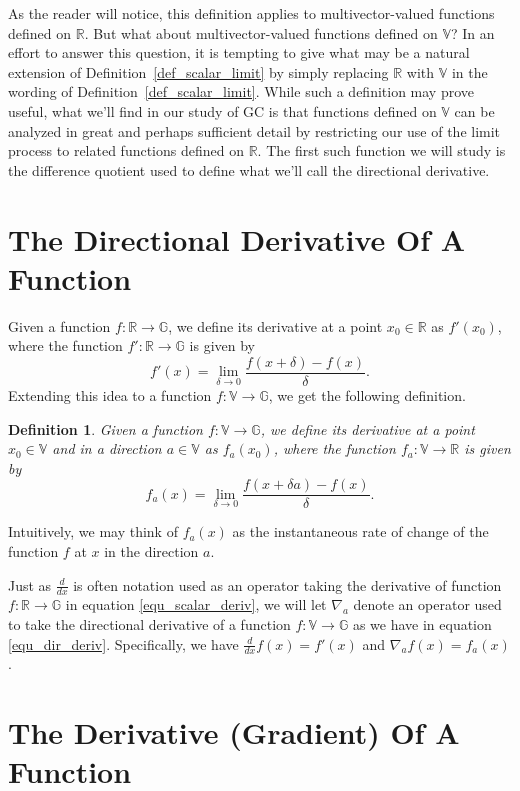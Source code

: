 \documentclass[12pt]{article}
\newcommand{\G}{\mathbb{G}}
\newcommand{\V}{\mathbb{V}}
\newcommand{\R}{\mathbb{R}}
\newtheorem{definition}{Definition}[section]
\begin{document}
As the reader will notice, this definition applies to multivector-valued functions
defined on $\R$.  But what about multivector-valued functions defined on $\V$?
In an effort to answer this question, it is tempting to give what may be a natural extension of
Definition~\ref{def_scalar_limit} by simply replacing $\R$ with $\V$ in the wording
of Definition~\ref{def_scalar_limit}.  While such a definition may prove useful,
what we'll find in our study of GC is that functions defined on $\V$ can be analyzed
in great and perhaps sufficient detail by restricting our use of the limit process to related functions
defined on $\R$.  The first such function we will study is the difference quotient used
to define what we'll call the directional derivative.

\section{The Directional Derivative Of A Function}

Given a function $f:\R\to\G$, we define its derivative at a point $x_0\in\R$ as
$f'(x_0)$, where the function $f':\R\to\G$ is given by
\begin{equation}\label{equ_scalar_deriv}
f'(x) = \lim_{\delta\to 0}\frac{f(x+\delta)-f(x)}{\delta}.
\end{equation}
Extending this idea to a function $f:\V\to\G$, we get the following definition.
\begin{definition}\label{def_dir_deriv}
Given a function $f:\V\to\G$, we define its derivative at a point $x_0\in\V$
and in a direction $a\in\V$ as $f_a(x_0)$, where the function $f_a:\V\to\R$ is given by
\begin{equation}\label{equ_dir_deriv}
f_a(x) = \lim_{\delta\to 0}\frac{f(x+\delta a)-f(x)}{\delta}.
\end{equation}
\end{definition}
Intuitively, we may think of $f_a(x)$ as the instantaneous rate of change
of the function $f$ at $x$ in the direction $a$.

Just as $\frac{d}{dx}$ is often notation used as an operator taking the
derivative of function $f:\R\to\G$ in equation \eqref{equ_scalar_deriv}, we will let
$\nabla_a$ denote an operator used to take the directional derivative of
a function $f:\V\to\G$ as we have in equation \eqref{equ_dir_deriv}.
Specifically, we have $\frac{d}{dx}f(x)=f'(x)$ and $\nabla_a f(x)=f_a(x)$.

\section{The Derivative (Gradient) Of A Function}
\end{document}
